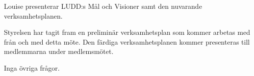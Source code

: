 \documentclass{protokoll}
\begin{document}
Louise presenterar LUDD:s Mål och Visioner samt den nuvarande verksamhetsplanen.  

Styrelsen har tagit fram en preliminär verksamhetsplan som kommer arbetas med
från och med detta möte. Den färdiga verksamhetsplanen kommer presenteras till
medlemmarna under medlemsmötet. 

Inga övriga frågor.
\end{document}
